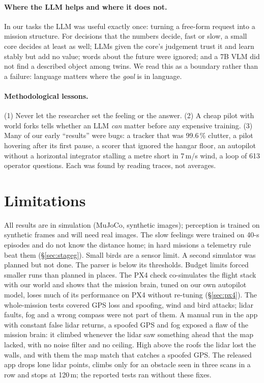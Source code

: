 \documentclass[10pt]{article}
\begin{document}
\paragraph{Where the LLM helps and where it does not.} In our tasks the LLM was useful exactly once: turning a free-form request
into a mission structure. For decisions that the numbers decide, fast or slow, a small core decides at least as well; LLMs given the
core's judgement trust it and learn stably but add no value; words about the future were ignored; and a 7B VLM did not find a
described object among twins. We read this as a boundary rather than a failure: language matters where the \emph{goal} is in language.
\paragraph{Methodological lessons.} (1) Never let the researcher set the feeling or the answer. (2) A cheap pilot with world forks
tells whether an LLM \emph{can} matter before any expensive training. (3) Many of our early ``results'' were bugs: a tracker that was
99.6\,\% clutter, a pilot hovering after its first pause, a scorer that ignored the hangar floor, an autopilot without a horizontal
integrator stalling a metre short in 7\,m/s wind, a loop of 613 operator questions. Each was found by reading traces, not averages.

\section{Limitations}
All results are in simulation (MuJoCo, synthetic images); perception is trained on synthetic frames and will need real images.
The slow feelings were trained on 40-s episodes and do not know the distance home; in hard missions a telemetry rule beat them
(\S\ref{sec:stageg}). Small birds are a sensor limit. A second simulator
was planned but not done. The parser is below its thresholds. Budget limits forced smaller runs than planned in places. The PX4 check
co-simulates the flight stack with our world and shows that the mission brain, tuned on our own autopilot model, loses much of its
performance on PX4 without re-tuning (\S\ref{sec:px4}). The whole-mission tests covered GPS loss and spoofing, wind and bird attacks;
lidar faults, fog and a wrong compass were not part of them. A manual run in the app with constant false lidar returns, a spoofed
GPS and fog exposed a flaw of the mission brain: it climbed whenever the lidar saw something ahead that the map lacked, with no noise
filter and no ceiling. High above the roofs the lidar lost the walls, and with them the map match that catches a spoofed GPS. The
released app drops lone lidar points, climbs only for an obstacle seen in three scans in a row and stops at 120\,m; the reported
tests ran without these fixes.
\end{document}
